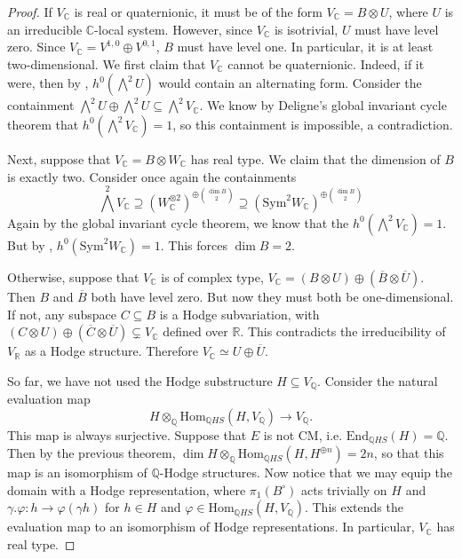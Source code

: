 \documentclass[10pt,a4paper]{amsart}
\newcommand{\C}{\mathbb{C}}
\newcommand{\End}{\text{End}}
\newcommand{\Hom}{\text{Hom}}
\newcommand{\Q}{\mathbb{Q}}
\newcommand{\R}{\mathbb{R}}
\begin{document}
\begin{proof}
If \(V_\C\) is real or quaternionic, it must be
of the form \(V_\C = B \otimes U\), where \(U\) is an irreducible \(\C\)-local system.
However, since \(V_\C\) is isotrivial, \(U\) must have level zero. Since 
\(V_\C = V^{1,0} \oplus V^{0,1}\), \(B\) must have level one. In particular, it is 
at least two-dimensional.
We first claim that \(V_\C\) cannot be quaternionic. Indeed, if it were, then
by , \(h^0(\bigwedge^2 U)\) would contain
an alternating form. Consider the containment
\(\bigwedge^2 U \oplus \bigwedge^2 U \subseteq \bigwedge^2 V_\C\).
We know by Deligne's global invariant cycle theorem that 
\(h^0 \left(\bigwedge^2 V_\C\right) = 1\), so this containment is impossible, a contradiction.


Next, suppose that \(V_\C = B \otimes W_\C\) has real type. We claim
that the dimension of \(B\) is exactly two. Consider once again the containments
\begin{equation}
    \bigwedge^2 V_\C \supseteq (W_\C^{\otimes 2})^{\oplus \binom{\dim B}{2}}
    \supseteq (\text{Sym}^{2}W_\C)^{\oplus \binom{\dim B}{2}}
\end{equation}
Again by the global invariant cycle theorem, we know that the 
\(h^0(\bigwedge^2 V_\C) = 1\). But by ,
\(h^0(\text{Sym}^2 W_\C) = 1\). This forces \(\dim B = 2\).


Otherwise, suppose that \(V_\C\) is of complex type, 
\(V_\C = (B \otimes U) \oplus (\overline{B} \otimes \overline{U})\).
Then \(B\) and \(\overline{B}\) both have level zero. But now they must both be 
one-dimensional. If not, any subspace \(C \subseteq B\) is a Hodge subvariation,
with \((C \otimes U) \oplus (\overline{C} \otimes \overline{U}) \subsetneq V_\C\)
defined over \(\R\). This contradicts the irreducibility of \(V_\R\) as a Hodge 
structure. Therefore \(V_\C \simeq U \oplus \overline{U}\).


So far, we have not used the Hodge substructure \(H \subseteq V_\Q\). Consider 
the natural evaluation map 
\begin{equation}
    H \otimes_\Q \Hom_{\Q HS}(H, V_\Q) \to V_\Q.
\end{equation}
This map is always surjective. Suppose that \(E\) is not CM, i.e.
\(\End_{\Q HS}(H) = \Q\). Then by the previous theorem, 
\(\dim H \otimes_\Q \Hom_{\Q HS}(H, H^{\oplus n}) = 2n\), so that 
this map is an isomorphism of \(\Q\)-Hodge structures. Now notice that we may 
equip the domain with a Hodge representation, where \(\pi_1(B^\circ)\) acts 
trivially on \(H\) and \(\gamma . \varphi: h \to \varphi(\gamma h)\) for 
\(h \in H\) and \(\varphi \in \Hom_{\Q HS}(H, V_\Q)\). This extends the evaluation 
map to an isomorphism of Hodge representations. In particular, \(V_\C\) has real 
type.


\end{proof}
\end{document}
